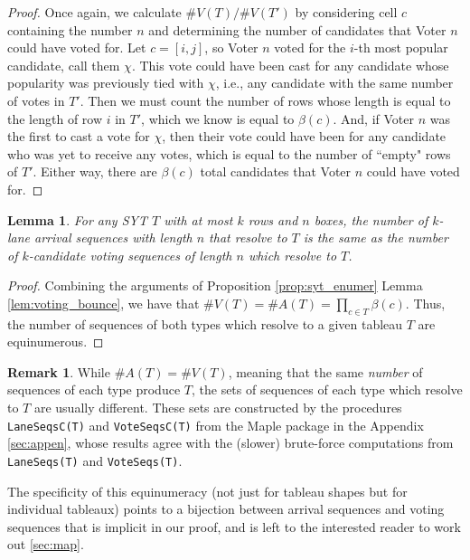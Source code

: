 \documentclass[article]{amsart}
\theoremstyle{plain}
\newtheorem{lemma}[proposition]{Lemma}
\theoremstyle{definition}
\newtheorem{remark}[proposition]{Remark}
\begin{document}
\begin{proof}
    Once again, we calculate $\#V(T)/\#V(T')$ by considering cell $c$ containing the number $n$ and determining the number of candidates that Voter $n$ could have voted for. Let $c = [i,j]$, so Voter $n$ voted for the $i$-th most popular candidate, call them $\chi$. This vote could have been cast for any candidate whose popularity was previously tied with $\chi$, i.e., any candidate with the same number of votes in $T'$. Then we must count the number of rows whose length is equal to the length of row $i$ in $T'$, which we know is equal to $\beta(c)$. And, if Voter $n$ was the first to cast a vote for $\chi$, then their vote could have been for any candidate who was yet to receive any votes, which is equal to the number of ``empty" rows of $T'$. Either way, there are $\beta(c)$ total candidates that Voter $n$ could have voted for.
\end{proof}

\begin{lemma} \label{lem:equiv}
    For any SYT $T$ with at most $k$ rows and $n$ boxes, the number of $k$-lane arrival sequences with length $n$ that resolve to $T$ is the same as the number of $k$-candidate voting sequences of length $n$ which resolve to $T$.
\end{lemma}

\begin{proof}
Combining the arguments of Proposition \ref{prop:syt_enumer} Lemma \ref{lem:voting_bounce}, we have that $\#V(T) = \#A(T) = \prod_{c \in T} \beta(c)$. Thus, the number of sequences of both types which resolve to a given tableau $T$ are equinumerous.
\end{proof}

\begin{remark}
    While $\#A(T) = \#V(T)$, meaning that the same \textit{number} of sequences of each type produce $T$, the sets of sequences of each type which resolve to $T$ are usually different. These sets are constructed by the procedures \texttt{LaneSeqsC(T)} and \texttt{VoteSeqsC(T)} from the Maple package in the Appendix \ref{sec:appen}, whose results agree with the (slower) brute-force computations from \texttt{LaneSeqs(T)} and \texttt{VoteSeqs(T)}.
\end{remark}

The specificity of this equinumeracy (not just for tableau shapes but for individual tableaux) points to a bijection between arrival sequences and voting sequences that is implicit in our proof, and is left
to the interested reader to work out \ref{sec:map}.
\end{document}
